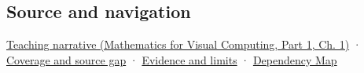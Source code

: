 \subsection{Source and navigation}\label{appendix-2391db8052b1-source-and-navigation}

\hypertarget{appendix-2391db8052b1-source-and-navigation}{}

\href{../02-Mathematics-for-Visual-Computing-P01/main.pdf\#nameddest=01-foundations-i-ch017-oriented-area-tells-us-which-side-of-the-panel-is-front}{Teaching narrative (Mathematics for Visual Computing, Part 1, Ch. 1)} · \hyperref[appendix-fd090d982a15-phase-6---parts-501-600]{Coverage and source gap} · \hyperref[appendix-a103e7846d21-phase-6---source-analysis-and-verification]{Evidence and limits} · \hyperref[appendix-4ad47bdd269a]{Dependency Map}
